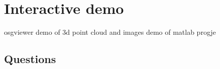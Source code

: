 \documentclass{beamer}
\begin{document}
%
%
%
%
%
%
%









\section{Interactive demo}
	osgviewer demo of 3d point cloud and images
	demo of matlab progje


\subsection{Questions}
\end{document}
